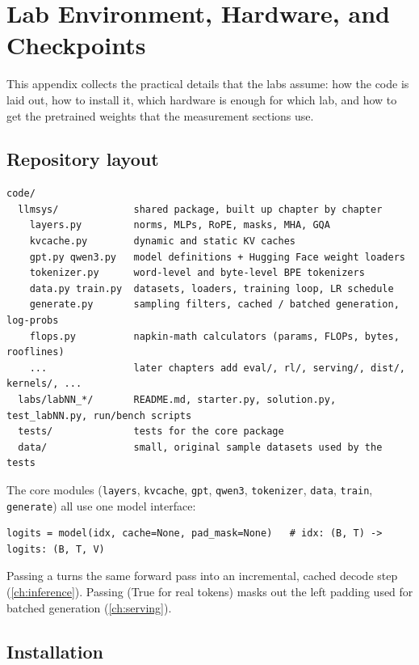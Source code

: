 \chapter{Lab Environment, Hardware, and Checkpoints}\label{app:setup}

This appendix collects the practical details that the labs assume: how the code is laid out,
how to install it, which hardware is enough for which lab, and how to get the pretrained weights
that the measurement sections use.

\section{Repository layout}

\begin{lstlisting}[style=plain]
code/
  llmsys/             shared package, built up chapter by chapter
    layers.py         norms, MLPs, RoPE, masks, MHA, GQA
    kvcache.py        dynamic and static KV caches
    gpt.py qwen3.py   model definitions + Hugging Face weight loaders
    tokenizer.py      word-level and byte-level BPE tokenizers
    data.py train.py  datasets, loaders, training loop, LR schedule
    generate.py       sampling filters, cached / batched generation, log-probs
    flops.py          napkin-math calculators (params, FLOPs, bytes, rooflines)
    ...               later chapters add eval/, rl/, serving/, dist/, kernels/, ...
  labs/labNN_*/       README.md, starter.py, solution.py, test_labNN.py, run/bench scripts
  tests/              tests for the core package
  data/               small, original sample datasets used by the tests
\end{lstlisting}

The core modules (\texttt{layers}, \texttt{kvcache}, \texttt{gpt}, \texttt{qwen3},
\texttt{tokenizer}, \texttt{data}, \texttt{train}, \texttt{generate}) all use one model
interface:
\begin{lstlisting}
logits = model(idx, cache=None, pad_mask=None)   # idx: (B, T) -> logits: (B, T, V)
\end{lstlisting}
Passing a  turns the same forward pass into an incremental, cached decode step
(\cref{ch:inference}). Passing  (True for real tokens) masks out the
left padding used for batched generation (\cref{ch:serving}).

\section{Installation}

